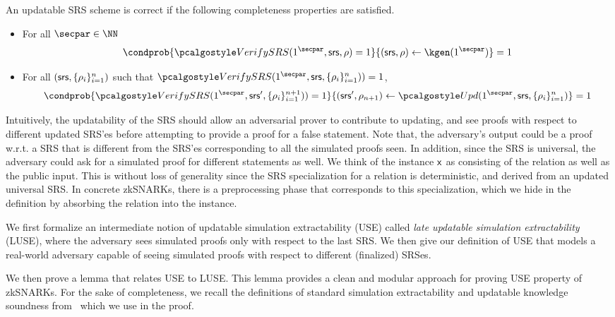 \begin{definition}
	An updatable SRS scheme is correct if the following completeness properties are satisfied.
	
	\begin{itemize}
		
		\item
		For all $\secpar \in \NN$
		\[
		\condprob{\verifyCRS(1^\secpar,\srs,\rho) = 1}{(\srs,\rho) \leftarrow \kgen(1^\secpar)} = 1
		\]
		\item
		
		For all $(\mathsf{srs},\{\rho_i \}_{i=1}^n)$ such that $\verifyCRS(1^\secpar,\srs,\{\rho_i \}_{i=1}^n))=1$,
		\[
		\condprob{\verifyCRS(1^\secpar,\srs',\{\rho_i \}_{i=1}^{n+1}))=1}{(\srs',\rho_{n+1}) \leftarrow \upd(1^\secpar,\srs,\{\rho_i \}_{i=1}^n)} = 1
		\]
		
	\end{itemize}
\end{definition} 


Intuitively, the updatability of the SRS should allow an adversarial prover to contribute to updating, and see proofs with respect to different updated SRS'es before attempting to provide a proof for a false statement. Note that, the adversary's output could be a proof w.r.t. a SRS that is different from the SRS'es corresponding to all the simulated proofs seen. In addition, since the SRS is universal, the adversary could ask for a simulated proof for different statements as well. We think of the instance $\mathsf{x}$ as consisting of the relation as well as the public input. This is without loss of generality since the SRS specialization for a relation is deterministic, and derived from an updated universal SRS. In concrete zkSNARKs, there is a preprocessing phase that corresponds to this specialization, which we hide in the definition by absorbing the relation into the instance.

We first formalize an intermediate notion of updatable simulation extractability (USE) called \emph{late updatable simulation extractability} (LUSE), where the adversary sees simulated proofs only with respect to the last SRS. We then give our definition of USE that models a real-world adversary capable of seeing simulated proofs with respect to different (finalized) SRSes.

We then prove a lemma that relates USE to LUSE. This lemma provides a clean and modular approach for proving USE property of zkSNARKs. 
For the sake of completeness, we recall the definitions of standard simulation extractability and updatable knowledge soundness from~\cite{C:GKMMM18} which we use in the proof.

